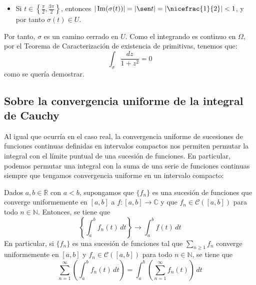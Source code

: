 \begin{ejercicio}
\begin{description}
\begin{itemize}
            \item Si $t\in \left\{\frac{\pi}{2},\frac{3\pi}{2}\right\}$, entonces $|\Im(\sigma(t))|=|\sen t|=\left|\nicefrac{1}{2}\right|<1$, y por tanto $\sigma(t) \in U$.            
        \end{itemize}

        Por tanto, $\sigma$ es un camino cerrado en $U$. Como el integrando es continuo en $\Omega$, por el Teorema de Caracterización de existencia de primitivas, tenemos que:
        \begin{equation*}
            \int_{\sigma} \frac{dz}{1+z^2} = 0
        \end{equation*}
        como se quería demostrar.
    \end{description}
\end{ejercicio}




\newpage
    
\subsection{Sobre la convergencia uniforme de la integral de Cauchy}\label{sec:converge_uniforme_integral_cauchy}
Al igual que ocurría en el caso real, la convergencia uniforme de
sucesiones de funciones continuas definidas en intervalos compactos
nos permiten permutar la integral con el límite puntual de una sucesión
de funciones. En particular, podemos permutar una integral con la suma
de una serie de funciones continuas siempre que tengamos convergencia
uniforme en un intervalo compacto:
\begin{teo}
    Dados $a,b \in \mathbb{R}$ con $a < b$, supongamos que $\{f_n\}$ es una sucesión de funciones
    que converge uniformemente en $[a,b]$ a $f : [a,b] \rightarrow \mathbb{C}$ y que
    $f_n \in \mathcal{C}([a,b])$ para todo $n \in \mathbb{N}$. Entonces, se tiene que
    \begin{equation*}
        \left\{\displaystyle\int_{a}^{b} f_n(t) \,dt\right\} \rightarrow
        \displaystyle\int_{a}^{b} f(t) \,dt
    \end{equation*}
    En particular, si $\{f_n\}$ es una sucesión de funciones tal que $\displaystyle\sum_{n \geq 1} f_n$
    converge uniformemente en $[a,b]$ y $f_n \in \mathcal{C}([a,b])$ para todo $n \in \mathbb{N}$,
    se tiene que
    \begin{equation*}
        \displaystyle\sum_{n=1}^{\infty} \left(\int_{a}^{b} f_n(t) \,dt\right)=
        \displaystyle\int_{a}^{b} \left(\displaystyle\sum_{n=1}^{\infty} f_n(t) \right) \,dt
    \end{equation*}
\end{teo}

